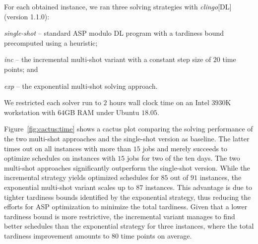\documentclass[submission,copyright,creativecommons]{eptcs}
\begin{document}
For each obtained instance, we ran three solving strategies with \emph{clingo}[DL] (version 1.1.0): 
\begin{enumerate*}[label=\emph{(\arabic*)}]	
	\item \emph{single-shot} -- standard ASP modulo DL program with a tardiness bound precomputed using a heuristic;
	\item \emph{inc} -- the incremental multi-shot variant
	                    with a constant step size of $20$ time points; and 
	\item \emph{exp} -- the exponential multi-shot solving approach.
\end{enumerate*}
We restricted each solver run to $2$ hours wall clock time on an
Intel $3930$K workstation with $64$GB RAM under Ubuntu $18.05$. 

Figure~\ref{fig:cactus:time} shows a cactus plot comparing
the solving performance of the two multi-shot approaches and the single-shot version
as baseline.
The latter times out on all instances with more than $15$ jobs and merely succeeds to
optimize schedules on instances with $15$ jobs for two of the ten days.
%
The two multi-shot approaches significantly outperform the single-shot version. %
While the incremental strategy yields optimized schedules for $85$ out of $91$ instances,
the exponential multi-shot variant scales up to $87$ instances.
This advantage is due to tighter tardiness bounds identified by the exponential 
strategy, thus reducing the efforts for ASP optimization to minimize the total tardiness.
Given that a lower tardiness bound is more restrictive,
the incremental variant manages to find better schedules than the exponential strategy for three instances, where the total tardiness improvement amounts to $80$ time points on average.
\end{document}
